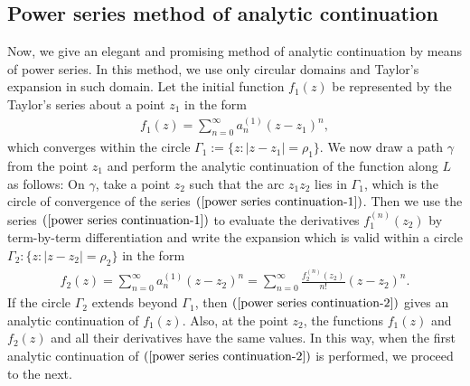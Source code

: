 \subsection{Power series method of analytic continuation}
Now, we give an elegant and promising method of analytic continuation by means of power series. In this method, we use only circular domains and Taylor's expansion in such domain. Let the initial function $f_1(z)$ be represented by the Taylor's series about a point $z_1$ in the form
\begin{align}\label{power series continuation-1}
f_1(z)=\sum_{n=0}^{\infty}a_{n}^{(1)}(z-z_1)^n,
\end{align}
which converges within the circle $\Gamma_1:=\{z:|z-z_1|=\rho_1\}$. We now draw a path $\gamma$ from the point $z_1$ and perform the analytic continuation of the function along $L$ as follows: On $\gamma$, take a point $z_2$ such that the arc $z_1z_2$ lies in $\Gamma_1$, which is the circle of convergence of the series $(\ref{power series continuation-1})$. Then we use the series $(\ref{power series continuation-1})$ to evaluate the derivatives $f^{(n)}_1(z_2)$ by term-by-term differentiation and write the expansion which is valid within a circle $\Gamma_2:\{z:|z-z_2|=\rho_2\}$ in the form
\begin{align}\label{power series continuation-2}
f_2(z)=\sum_{n=0}^{\infty}a_{n}^{(1)}(z-z_2)^n=\sum_{n=0}^{\infty}\frac{f_2^{(n)}(z_2)}{n!}(z-z_2)^n.
\end{align}
If the circle $\Gamma_2$ extends beyond $\Gamma_1$, then $(\ref{power series continuation-2})$ gives an analytic continuation of $f_1(z)$. Also, at the point $z_2$, the functions $f_1(z)$ and $f_2(z)$ and all their derivatives have the same values. In this way, when the first analytic continuation of $(\ref{power series continuation-2})$ is performed, we proceed to the next.
